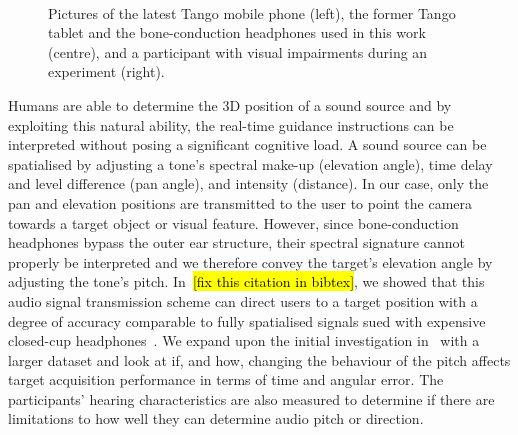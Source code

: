 \documentclass{article}
\DeclareRobustCommand{\tofix}[1]{{\sethlcolor{yellow}\hl{[#1]}}}
\begin{document}
\begin{figure}[t]
  \centering
~
~
  \caption{Pictures of the latest Tango mobile phone (left), the former Tango tablet and the bone-conduction headphones used in this work (centre), and a participant with visual impairments during an experiment (right).}
\end{figure}

Humans are able to determine the 3D position of a sound source and by exploiting this natural ability, the real-time guidance instructions can be interpreted without posing a significant cognitive load.
A sound source can be spatialised by adjusting a tone's spectral make-up (elevation angle), time delay and level difference (pan angle), and intensity (distance).
In our case, only the pan and elevation positions are transmitted to the user to point the camera towards a target object or visual feature.
However, since bone-conduction headphones bypass the outer ear structure, their spectral signature cannot properly be interpreted and we therefore convey the target's elevation angle by adjusting the tone's pitch.
In~\cite{lock2019bone}\tofix{fix this citation in bibtex}, we showed that this audio signal transmission scheme can direct users to a target position with a degree of accuracy comparable to fully spatialised signals sued with expensive closed-cup headphones~\cite{macdonald2006spatial}.
We expand upon the initial investigation in~\cite{lock2019bone} with a larger dataset and look at if, and how, changing the behaviour of the pitch affects target acquisition performance in terms of time and angular error. 
The participants' hearing characteristics are also measured to determine if there are limitations to how well they can determine audio pitch or direction. 
\end{document}
